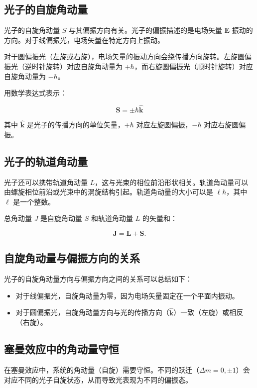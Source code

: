\documentclass[dvipsnames, svgnames,a4paper,11pt]{article}
\begin{document}
	
	\subsection*{光子的自旋角动量}
	
	光子的自旋角动量 $S$ 与其偏振方向有关。光子的偏振描述的是电场矢量 $\mathbf{E}$ 振动的方向。对于线偏振光，电场矢量在特定方向上振动。
	
	对于圆偏振光（左旋或右旋），电场矢量的振动方向会绕传播方向旋转。左旋圆偏振光（逆时针旋转）对应自旋角动量为 $+\hbar$，而右旋圆偏振光（顺时针旋转）对应自旋角动量为 $-\hbar$。
	
	用数学表达式表示：
	

$$	\mathbf{S} = \pm \hbar \hat{\mathbf{k}}$$

	
	其中 $\hat{\mathbf{k}}$ 是光子的传播方向的单位矢量，$+\hbar$ 对应左旋圆偏振，$-\hbar$ 对应右旋圆偏振。
	
	\subsection*{光子的轨道角动量}
	
	光子还可以携带轨道角动量 $L$，这与光束的相位前沿形状相关。轨道角动量可以由螺旋相位前沿或光束中的涡旋结构引起。轨道角动量的大小可以是 $\ell \hbar$，其中 $\ell$ 是一个整数。
	
	总角动量 $J$ 是自旋角动量 $S$ 和轨道角动量 $L$ 的矢量和：
	
	$$
	\mathbf{J} = \mathbf{L} + \mathbf{S}.
	$$
	
	\subsection*{自旋角动量与偏振方向的关系}
	
	光子的自旋角动量方向与偏振方向之间的关系可以总结如下：
	
	\begin{itemize}
		\item 对于线偏振光，自旋角动量为零，因为电场矢量固定在一个平面内振动。
		\item 对于圆偏振光，自旋角动量方向与光的传播方向（$\hat{\mathbf{k}}$）一致（左旋）或相反（右旋）。
	\end{itemize}
	
	\subsection*{塞曼效应中的角动量守恒}
	
	在塞曼效应中，系统的角动量（自旋）需要守恒。不同的跃迁（$\Delta m = 0, \pm1$）会对应不同的光子自旋状态，从而导致光表现为不同的偏振态。
	
\end{document}
